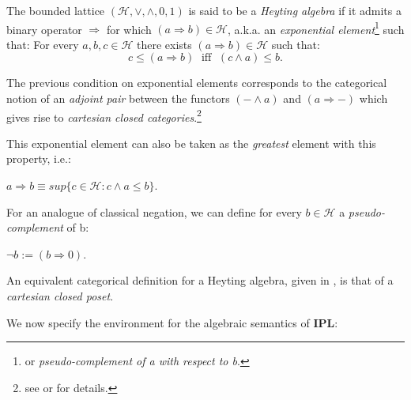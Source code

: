  		\begin{definition}\label{heytingalg}
 		The bounded lattice $(\mathcal{H}, \lor, \land, 0, 1)$ is said to be a \emph{Heyting algebra} if it admits a binary operator $\Rightarrow$ for which $(a \Rightarrow b) \in \mathcal{H}$, a.k.a. an \emph{exponential element}\footnote{or \emph{pseudo-complement of a with respect to b}.} such that:\newline
 			For every $a,b,c \in \mathcal{H}$ \newline there exists $(a \Rightarrow b) \in \mathcal{H}$  such that: 
 			\begin{equation*}
 				c \leq (a \Rightarrow b) \;\text{ iff }\; (c \land a) \leq b.
 			\end{equation*}
 		\end{definition}
 \begin{remark}
 	The previous condition on exponential elements corresponds to the categorical notion of an \emph{adjoint pair} between the functors $(- \land a)$ and $(a \Rightarrow -)$ which gives rise to \emph{cartesian closed categories}.\footnote{see \cite{awodey} or \cite{maclane} for details.}
 \end{remark}
 		
 			This exponential element can also be taken as the \emph{greatest} element with this property, i.e.:
 		\begin{prop}
 			$a \Rightarrow b \equiv sup\{ c \in \mathcal{H} : c \land a \leq b \}$.	
 		\end{prop}
 	

For an analogue of classical negation, 
 		we can define for every $b \in \mathcal{H}$ a \emph{pseudo-complement} of b:
 		\begin{definition}
 			$\neg b := (b \Rightarrow 0)$.
 		\end{definition}

\begin{remark}
	An equivalent categorical definition for a Heyting algebra, given in \cite{awodey}, is that of a \emph{cartesian closed poset}. 
\end{remark}
		We now specify the environment for the algebraic semantics of \textbf{IPL}:
	

